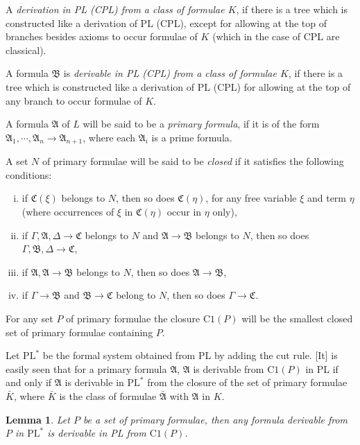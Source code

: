 \documentclass[12pt,a4paper]{article}
\newtheorem{lemma}{Lemma}
\begin{document}
A \emph{derivation in PL (CPL) from a class of formulae $K$}, if there is a
tree which is constructed like a derivation of PL (CPL), except for allowing
at the top of branches besides axioms to occur formulae of $K$ (which in the
case of CPL are classical).

A formula $\mathfrak{B}$ is \emph{derivable in PL (CPL) from a class of
formulae $K$}, if there is a tree which is constructed like a derivation of PL
(CPL) for allowing at the top of any branch to occur formulae of $K$.

A formula $\mathfrak{A}$ of $L$ will be said to be a \emph{primary formula},
if it is of the form $\mathfrak{A}_1, \cdots, \mathfrak{A}_n \to \mathfrak{A}_{n+1}$,
where each $\mathfrak{A}_i$ is a prime formula.

A set $N$ of primary formulae will be said to be \emph{closed} if it
satisfies the following conditions:
\begin{enumerate}[(i)]
\item if $\mathfrak{C}(\xi)$ belongs to $N$, then so does $\mathfrak{C}(\eta)$,
  for any free variable $\xi$ and term $\eta$ (where occurrences of $\xi$ in
  $\mathfrak{C}(\eta)$ occur in $\eta$ only),
\item if $\Gamma, \mathfrak{A}, \Delta \to \mathfrak{C}$ belongs to $N$ and
  $\mathfrak{A} \to \mathfrak{B}$ belongs to $N$, then so does
  $\Gamma, \mathfrak{B}, \Delta \to \mathfrak{C}$,
\item if $\mathfrak{A}, \mathfrak{A} \to \mathfrak{B}$ belongs to $N$, then
  so does $\mathfrak{A} \to \mathfrak{B}$,
\item if $\Gamma \to \mathfrak{B}$ and $\mathfrak{B} \to \mathfrak{C}$ belong
  to $N$, then so does $\Gamma \to \mathfrak{C}$.
\end{enumerate}
For any set $P$ of primary formulae the closure $\mathrm{C1}(P)$ will be the
smallest closed set of primary formulae containing $P$.

Let $\mathrm{PL}^*$ be the formal system obtained from PL by adding the cut
rule. [It] is easily seen that for a primary formula $\mathfrak{A}$,
$\mathfrak{A}$ is derivable from $\mathrm{C1}(P)$ in PL if and only if
$\mathfrak{A}$ is derivable in $\mathrm{PL}^*$ from the closure of the set of
primary formulae $\bar{K}$, where $\bar{K}$ is the class of formulae
$\bar{\mathfrak{A}}$ with $\mathfrak{A}$ in $K$.

\begin{lemma}
Let $P$ be a set of primary formulae, then any formula derivable from $P$ in
$\mathrm{PL}^*$ is derivable in PL from $\mathrm{C1}(P)$.
\end{lemma}
\end{document}
